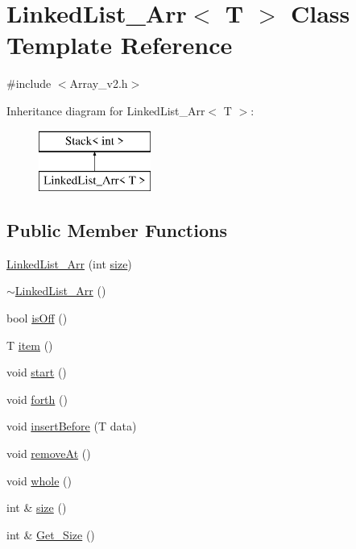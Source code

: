 \hypertarget{class_linked_list___arr}{\section{Linked\-List\-\_\-\-Arr$<$ T $>$ Class Template Reference}
\label{class_linked_list___arr}
}


{\ttfamily \#include $<$Array\-\_\-v2.\-h$>$}

Inheritance diagram for Linked\-List\-\_\-\-Arr$<$ T $>$\-:\begin{figure}[H]
\begin{center}
\leavevmode
\includegraphics[height=2.000000cm]{class_linked_list___arr}
\end{center}
\end{figure}
\subsection*{Public Member Functions}
\begin{DoxyCompactItemize}
\item 
\hyperlink{class_linked_list___arr_a913dc6e05c3a3c94bb0ef0be43a1202c}{Linked\-List\-\_\-\-Arr} (int \hyperlink{class_linked_list___arr_a52b5c93d6141eb728e60e744c22a06b7}{size})
\item 
\hyperlink{class_linked_list___arr_ad4713d029be52b6cfcd14a0558f12ced}{$\sim$\-Linked\-List\-\_\-\-Arr} ()
\item 
bool \hyperlink{class_linked_list___arr_ac3741a20c72a97e6b37337ba882d9dad}{is\-Off} ()
\item 
T \hyperlink{class_linked_list___arr_a7084841d8f7d76312860d360ff366f20}{item} ()
\item 
void \hyperlink{class_linked_list___arr_a173f5d2e3f4d631b861bbeb9ac674a57}{start} ()
\item 
void \hyperlink{class_linked_list___arr_a034426b6a41088ad772599358e3cec96}{forth} ()
\item 
void \hyperlink{class_linked_list___arr_a317c3d744519ad9036008fcd79e604ee}{insert\-Before} (T data)
\item 
void \hyperlink{class_linked_list___arr_af008582dc60cabeea08e3cac98e0d793}{remove\-At} ()
\item 
void \hyperlink{class_linked_list___arr_a77f9a7fbe17c58df9137e3da3d3f73cd}{whole} ()
\item 
int \& \hyperlink{class_linked_list___arr_a52b5c93d6141eb728e60e744c22a06b7}{size} ()
\item 
int \& \hyperlink{class_linked_list___arr_a5c8bb3dbdc03d6e473142641852bb670}{Get\-\_\-\-Size} ()
\end{DoxyCompactItemize}
